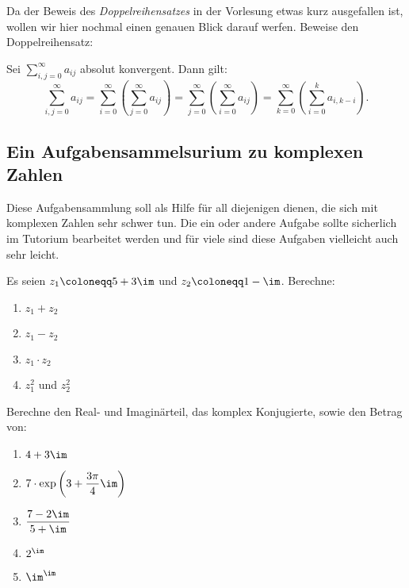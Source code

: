 \begin{exercise}
  Da der Beweis des \emph{Doppelreihensatzes} in der Vorlesung etwas kurz
  ausgefallen ist, wollen wir hier nochmal einen genauen Blick darauf werfen.
  Beweise den Doppelreihensatz:
  \begin{theorem}[Doppelreihensatz]
    Sei $\displaystyle \sum_{i,j=0}^{\infty}a_{ij}$ absolut konvergent. Dann
    gilt:
    \begin{equation*}
      \sum_{i,j=0}^{\infty} a_{ij}
      =
      \sum_{i=0}^{\infty}\left( \sum_{j=0}^{\infty}a_{ij}\right)
      =
      \sum_{j=0}^{\infty}\left( \sum_{i=0}^{\infty}a_{ij}\right)
      =
      \sum_{k=0}^{\infty}\left( \sum_{i=0}^{k}a_{i,k-i}\right).
    \end{equation*}
  \end{theorem}
\end{exercise}

\newpage

\subsection*{Ein Aufgabensammelsurium zu komplexen Zahlen}
Diese Aufgabensammlung soll als Hilfe für all diejenigen dienen, die sich mit
komplexen Zahlen sehr schwer tun. Die ein oder andere Aufgabe sollte sicherlich
im Tutorium bearbeitet werden und für viele sind diese Aufgaben vielleicht auch
sehr leicht.

\begin{exercise}
  Es seien $z_1 \coloneqq 5 + 3\im$ und $z_2 \coloneqq 1 - \im$. Berechne:
  \begin{enumerate}[label=(\alph*)]  \item $z_1 + z_2$
  \item $z_1 - z_2$
  \item $z_1 \cdot z_2$
  \item $ z_1^2 $ und $z_2^2$
  \end{enumerate}
\end{exercise}

\begin{exercise}
  \label{ex:complex-calculations}
  Berechne den Real- und Imaginärteil, das komplex Konjugierte, sowie den Betrag
  von:
  \begin{enumerate}[label=(\alph*)]
  \item $4 + 3\im$
  \item $\displaystyle 7 \cdot \exp\left(3 + \frac{3 \pi}{4} \im\right)$
  \item $\displaystyle\frac{7 - 2\im}{5 + \im}$
  \item $2^\im$
  \item $\im^\im$
  \end{enumerate}
\end{exercise}
